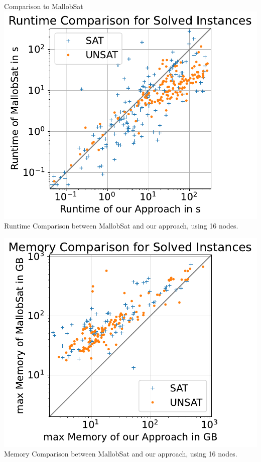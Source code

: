 \documentclass{beamer}
\begin{document}
\begin{frame}{Comparison to MallobSat}
    \center
    \includegraphics[scale=.45]{plots/square_runtime_compare/square_runtime_16node.pdf}\\
    Runtime Comparison between MallobSat and our approach, using 16 nodes.
\end{frame}

\begin{frame}{}
    \center
    \includegraphics[scale=.45]{plots/square_mem_compare/square_mem_16node.pdf}\\
    Memory Comparison between MallobSat and our approach, using 16 nodes.
\end{frame}
\end{document}
